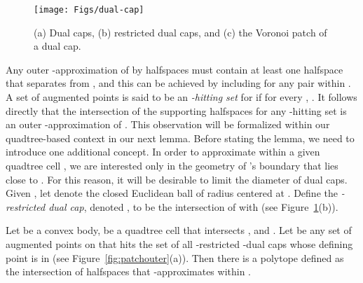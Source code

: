 \documentclass[11pt]{article}   \usepackage[letterpaper,hmargin=2.1cm,vmargin=3cm]{geometry}
\begin{document}
\begin{figure}[htbp]
  \centerline{\texttt{[image: Figs/dual-cap]}}
  \caption{(a) Dual caps, (b) restricted dual caps, and (c) the Voronoi patch of a dual cap.}
  \label{fig:dual-cap}
\end{figure}


Any outer -approximation of  by halfspaces must contain at least one halfspace that separates  from , and this can be achieved by including  for any pair  within . A set of augmented points  is said to be an \emph{-hitting set} for  if for every , . It follows directly that the intersection of the supporting halfspaces for any -hitting set is an outer -approximation of . This observation will be formalized within our quadtree-based context in our next lemma. Before stating the lemma, we need to introduce one additional concept. In order to approximate  within a given quadtree cell , we are interested only in the geometry of 's boundary that lies close to . For this reason, it will be desirable to limit the diameter of dual caps. Given , let  denote the closed Euclidean ball of radius  centered at . Define the \emph{-restricted dual cap}, denoted , to be the intersection of  with  (see Figure~\ref{fig:dual-cap}(b)).

\begin{lemma} \label{lem:patchouter}
Let  be a convex body,  be a quadtree cell that intersects , and . Let  be any set of augmented points on  that hits the set of all -restricted -dual caps whose defining point is in  (see Figure~\ref{fig:patchouter}(a)). Then there is a polytope  defined as the intersection of  halfspaces that -approximates  within .
\end{lemma}
\end{document}
